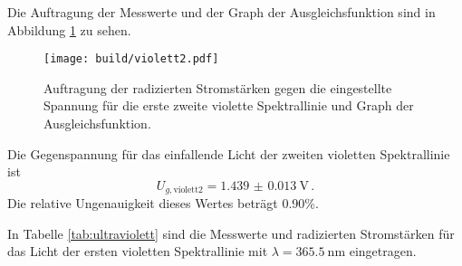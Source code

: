 Die Auftragung der Messwerte und der Graph der Ausgleichsfunktion sind in Abbildung \ref{fig:violett2} zu sehen.

\begin{figure}
  \centering
  \texttt{[image: build/violett2.pdf]}
  \caption{Auftragung der radizierten Stromstärken gegen die eingestellte Spannung für die erste zweite violette Spektrallinie und Graph der Ausgleichsfunktion.}
  \label{fig:violett2}
\end{figure}

Die Gegenspannung für das einfallende Licht der zweiten violetten Spektrallinie ist
\begin{equation*}
  U_{g,\text{violett2}} = \SI{1.439(0013)}{\volt}\,.
\end{equation*}
Die relative Ungenauigkeit dieses Wertes beträgt 0.90\%.

In Tabelle \ref{tab:ultraviolett} sind die Messwerte und radizierten Stromstärken
für das Licht der ersten violetten Spektrallinie mit $\lambda = \SI{365.5}{\nano\meter}$
eingetragen.

